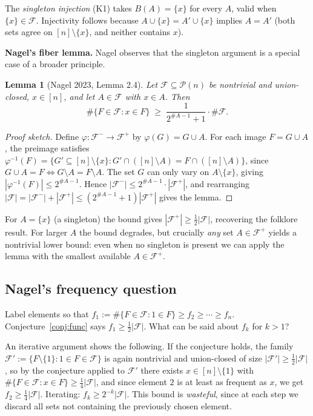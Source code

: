 \documentclass[11pt]{article}
\newtheorem{lemma}[theorem]{Lemma}
\theoremstyle{definition}
\theoremstyle{remark}
\newcommand{\F}{\mathcal{F}}
\newcommand{\Pow}{\mathcal{P}}
\begin{document}
The \emph{singleton injection} (K1) takes $B(A) = \{x\}$ for every $A$,
valid when $\{x\} \in \F$.
Injectivity follows because $A \cup \{x\} = A' \cup \{x\}$ implies
$A = A'$ (both sets agree on $[n] \setminus \{x\}$, and neither contains $x$).

\textbf{Nagel's fiber lemma.}
Nagel \cite{nagel2023} observes that the singleton argument is a special case of
a broader principle.

\begin{lemma}[Nagel 2023, Lemma 2.4]
\label{lem:fiber}
Let $\F \subseteq \Pow(n)$ be nontrivial and union-closed, $x \in [n]$, and
let $A \in \F$ with $x \in A$.  Then
\[
  \#\{F \in \F : x \in F\} \;\ge\; \frac{1}{2^{\#A - 1} + 1} \cdot \#\F.
\]
\end{lemma}

\begin{proof}[Proof sketch]
Define $\varphi : \F^- \to \F^+$ by $\varphi(G) = G \cup A$.
For each image $F = G \cup A$, the preimage satisfies
$\varphi^{-1}(F) = \{G' \subseteq [n]\setminus\{x\} : G' \cap ([n]\setminus A) = F \cap ([n]\setminus A)\}$,
since $G \cup A = F \Leftrightarrow G \setminus A = F \setminus A$.
The set $G$ can only vary on $A \setminus \{x\}$, giving $|\varphi^{-1}(F)| \le 2^{\#A-1}$.
Hence $|\F^-| \le 2^{\#A-1} \cdot |\F^+|$, and rearranging
$|\F| = |\F^-| + |\F^+| \le (2^{\#A-1}+1)|\F^+|$ gives the lemma.
\end{proof}

For $A = \{x\}$ (a singleton) the bound gives $|\F^+| \ge \frac{1}{2}|\F|$,
recovering the folklore result.
For larger $A$ the bound degrades, but crucially \emph{any} set $A \in \F^+$
yields a nontrivial lower bound: even when no singleton is present we can
apply the lemma with the smallest available $A \in \F^+$.

\subsection{Nagel's frequency question}

\label{sec:freq}

Label elements so that
$f_1 := \#\{F \in \F : 1 \in F\} \ge f_2 \ge \cdots \ge f_n$.
Conjecture~\ref{conj:func} says $f_1 \ge \tfrac{1}{2}|\F|$.
What can be said about $f_k$ for $k > 1$?

An iterative argument shows the following.
If the conjecture holds, the family $\F' := \{F \setminus \{1\} : 1 \in F \in \F\}$
is again nontrivial and union-closed of size $|\F'| \ge \tfrac{1}{2}|\F|$,
so by the conjecture applied to $\F'$ there exists $x \in [n] \setminus \{1\}$ with
$\#\{F \in \F : x \in F\} \ge \tfrac{1}{4}|\F|$,
and since element $2$ is at least as frequent as $x$, we get $f_2 \ge \tfrac{1}{4}|\F|$.
Iterating: $f_k \ge 2^{-k}|\F|$.
This bound is \emph{wasteful}, since at each step we discard all sets not
containing the previously chosen element.
\end{document}
